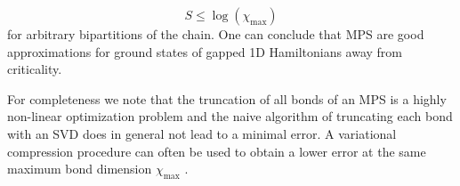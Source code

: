 \begin{equation}
	S \le \log\left(\chi_\text{max}\right)
\end{equation}
for arbitrary bipartitions of the chain. One can conclude that MPS are good approximations for ground states of gapped 1D Hamiltonians away from criticality. \par 
For completeness we note that the truncation of all bonds of an MPS is a highly non-linear optimization problem and the naive algorithm of truncating each bond with an SVD does in general not lead to a minimal error. A variational compression procedure can often be used to obtain a lower error at the same maximum bond dimension $\chi_\text{max}$ \cite{cite:DMRG_in_the_age_of_MPS}.
\par
{}